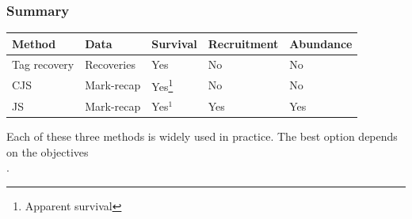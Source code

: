 \documentclass[color=usenames,dvipsnames]{beamer}\usepackage[]{graphicx}\usepackage[]{color}
\begin{document}
\begin{frame}
  \frametitle{Summary}
  \begin{tabular}{lllll}
    \hline
    Method & Data & Survival & Recruitment & Abundance \\
    \hline
    Tag recovery & Recoveries & Yes & No & No \\
    CJS & Mark-recap & Yes\footnote{Apparent survival} & No & No \\
    JS & Mark-recap & Yes$^1$ & Yes & Yes \\
    \hline
  \end{tabular}
  \vfill
  \centering
  Each of these three methods is widely used in practice. The best
  option depends on the objectives \\.
\end{frame}


\end{document}
